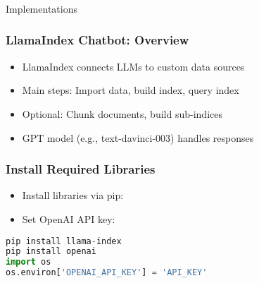 \begin{frame}[fragile]\frametitle{}
\begin{center}
{\Large Implementations}
\end{center}
\end{frame}






\begin{frame}[fragile]\frametitle{LlamaIndex Chatbot: Overview}
    \begin{itemize}
        \item LlamaIndex connects LLMs to custom data sources
        \item Main steps: Import data, build index, query index
        \item Optional: Chunk documents, build sub-indices
        \item GPT model (e.g., text-davinci-003) handles responses
    \end{itemize}
\end{frame}

\begin{frame}[fragile]\frametitle{Install Required Libraries}
    \begin{itemize}
        \item Install libraries via pip:
        \item Set OpenAI API key:
    \end{itemize}
\begin{lstlisting}[language=Python]
pip install llama-index
pip install openai
import os
os.environ['OPENAI_API_KEY'] = 'API_KEY'
\end{lstlisting}
\end{frame}


